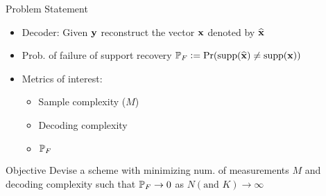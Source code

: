 \begin{frame}{Problem Statement}
\begin{itemize}
\item Decoder: Given $\mathbf{y}$ reconstruct the vector $\mathbf{x}$ denoted by $\widehat{\mathbf{x}}$
\item Prob. of failure of support recovery $\mathbb{P}_{F}\mathrel{\mathop:}= \text{Pr}(\text{supp}(\widehat{\mathbf{x}})\neq \text{supp}(\mathbf{x}))$
\item Metrics of interest:
\begin{itemize}
\item Sample complexity ($M$)
\item Decoding complexity
\item $\mathbb{P}_{F}$
\end{itemize} 
\end{itemize}
\vspace{5ex}

\begin{block}{Objective}
Devise a scheme with minimizing num. of measurements $M$ and decoding complexity such that $\mathbb{P}_{F}\rightarrow 0$ as $N (\text{and } K) \rightarrow \infty$
\end{block}
\end{frame}
